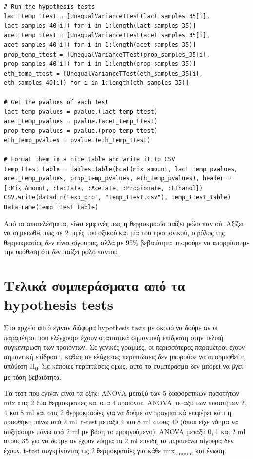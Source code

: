 \documentclass[11pt]{article}
\begin{document}
\begin{verbatim}

# Run the hypothesis tests
lact_temp_ttest = [UnequalVarianceTTest(lact_samples_35[i], lact_samples_40[i]) for i in 1:length(lact_samples_35)]
acet_temp_ttest = [UnequalVarianceTTest(acet_samples_35[i], acet_samples_40[i]) for i in 1:length(acet_samples_35)]
prop_temp_ttest = [UnequalVarianceTTest(prop_samples_35[i], prop_samples_40[i]) for i in 1:length(prop_samples_35)]
eth_temp_ttest = [UnequalVarianceTTest(eth_samples_35[i], eth_samples_40[i]) for i in 1:length(eth_samples_35)]

# Get the pvalues of each test
lact_temp_pvalues = pvalue.(lact_temp_ttest)
acet_temp_pvalues = pvalue.(acet_temp_ttest)
prop_temp_pvalues = pvalue.(prop_temp_ttest)
eth_temp_pvalues = pvalue.(eth_temp_ttest)

# Format them in a nice table and write it to CSV
temp_ttest_table = Tables.table(hcat(mix_amount, lact_temp_pvalues, acet_temp_pvalues, prop_temp_pvalues, eth_temp_pvalues), header = [:Mix_Amount, :Lactate, :Acetate, :Propionate, :Ethanol])
CSV.write(datadir("exp_pro", "temp_ttest.csv"), temp_ttest_table)
DataFrame(temp_ttest_table)
\end{verbatim}

Από τα αποτελέσματα, είναι εμφανές πως η θερμοκρασία παίζει ρόλο παντού. Αξίζει να σημειωθεί πως σε 2 τιμές του οξικού και μία του προπιονικού, ο ρόλος της θερμοκρασίας δεν είναι σίγουρος, αλλά με 95\% βεβαιότητα μπορούμε να απορρίψουμε την υπόθεση ότι δεν παίζει ρόλο παντού.

\section{Τελικά συμπεράσματα από τα hypothesis tests}
\label{sec:org6a0261d}
Στο αρχείο αυτό έγιναν διάφορα hypothesis tests με σκοπό να δούμε αν οι παραμέτροι που ελέγχουμε έχουν στατιστικά σημαντική επίδραση στην τελική συγκέντρωση των προιόντων. Σε γενικές γραμμές, οι περισσότερες παραμέτροι έχουν σημαντική επίδραση, καθώς σε ελάχιστες περιπτώσεις δεν μπορούσε να απορριφθεί η υπόθεση H\textsubscript{0}. Σε κάποιες περιπτώσεις όμως, αυτό το συμπέρασμα δεν μπορεί να βγεί με τόση βεβαιότητα.

Τα τεστ που έγιναν είναι τα εξής: ANOVA μεταξύ των 5 διαφορετικών ποσοτήτων mix στις 2 δύο θερμοκρασίες και στα 4 προιόντα. ANOVA μεταξύ των ποσοτήτων 2, 4 και 8 ml και στις 2 θερμοκρασίες για να δούμε αν πραγματικά επιφέρει κάτι η προσθήκη πάνω από 2 ml. t-test μεταξύ 4 και 8 ml στους 40 (όπου είχε νόημα να αυξήσουμε πάνω από 2 ml με βάση το προηγούμενο). ANOVA μεταξύ 0, 1 και 2 ml στους 35 για να δούμε αν έχουν νόημα τα 2 ml επειδή τα παραπάνω σίγουρα δεν έχουν. t-test συγκρίνοντας τις 2 θερμοκρασίες για κάθε mix\textsubscript{amount} και ένωση.
\end{document}
